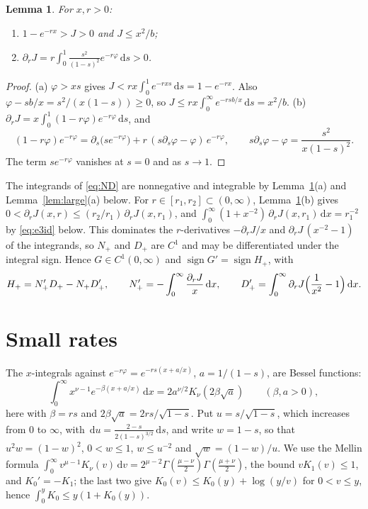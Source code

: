 \documentclass[11pt]{amsart}
\newtheorem{lemma}[theorem]{Lemma}
\theoremstyle{remark}
\numberwithin{equation}{section}
\newcommand{\dd}{\,\mathrm{d}}
\begin{document}
\begin{lemma}\label{lem:J}
For $x,r>0$:
\begin{enumerate}[label=(\alph*)]
\item $1-e^{-rx}>J>0$ and $J\le x^2/b$;
\item $\partial_rJ=r\int_0^1\frac{s^2}{(1-s)^2}e^{-r\varphi}\dd s>0$.
\end{enumerate}
\end{lemma}

\begin{proof}
(a) $\varphi>xs$ gives $J<rx\int_0^1e^{-rxs}\dd s=1-e^{-rx}$. Also $\varphi-sb/x=s^2/(x(1-s))\ge0$, so $J\le rx\int_0^\infty e^{-rsb/x}\dd s=x^2/b$. (b) $\partial_rJ=x\int_0^1(1-r\varphi)e^{-r\varphi}\dd s$, and
\[
(1-r\varphi)e^{-r\varphi}=\partial_s\bigl(se^{-r\varphi}\bigr)+r\,(s\partial_s\varphi-\varphi)\,e^{-r\varphi},\qquad s\partial_s\varphi-\varphi=\frac{s^2}{x(1-s)^2}.
\]
The term $se^{-r\varphi}$ vanishes at $s=0$ and as $s\to1$.
\end{proof}

The integrands of \eqref{eq:ND} are nonnegative and integrable by Lemma~\ref{lem:J}(a) and Lemma~\ref{lem:large}(a) below. For $r\in[r_1,r_2]\subset(0,\infty)$, Lemma~\ref{lem:J}(b) gives $0<\partial_rJ(x,r)\le(r_2/r_1)\,\partial_rJ(x,r_1)$, and $\int_0^\infty(1+x^{-2})\,\partial_rJ(x,r_1)\dd x=r_1^{-2}$ by \eqref{eq:e3id} below. This dominates the $r$-derivatives $-\partial_rJ/x$ and $\partial_rJ\,(x^{-2}-1)$ of the integrands, so $N_+$ and $D_+$ are $C^1$ and may be differentiated under the integral sign. Hence $G\in C^1(0,\infty)$ and $\operatorname{sign}G'=\operatorname{sign}H_+$, with
\begin{equation}\label{eq:H}
H_+=N_+'D_+-N_+D_+',\qquad N_+'=-\int_0^\infty\frac{\partial_rJ}{x}\dd x,\qquad D_+'=\int_0^\infty\partial_rJ\Bigl(\frac1{x^2}-1\Bigr)\dd x.
\end{equation}

\section{Small rates}\label{sec:small}

The $x$-integrals against $e^{-r\varphi}=e^{-rs(x+a/x)}$, $a=1/(1-s)$, are Bessel functions:
\begin{equation}\label{eq:bessel}
\int_0^\infty x^{\nu-1}e^{-\beta(x+a/x)}\dd x=2a^{\nu/2}K_\nu(2\beta\sqrt a)\qquad(\beta,a>0),
\end{equation}
here with $\beta=rs$ and $2\beta\sqrt a=2rs/\sqrt{1-s}$. Put $u=s/\sqrt{1-s}$, which increases from $0$ to $\infty$, with $\dd u=\frac{2-s}{2(1-s)^{3/2}}\dd s$, and write $w=1-s$, so that $u^2w=(1-w)^2$, $0<w\le1$, $w\le u^{-2}$ and $\sqrt w=(1-w)/u$. We use the Mellin formula $\int_0^\infty v^{\mu-1}K_\nu(v)\dd v=2^{\mu-2}\Gamma(\frac{\mu-\nu}2)\Gamma(\frac{\mu+\nu}2)$, the bound $vK_1(v)\le1$, and $K_0'=-K_1$; the last two give $K_0(v)\le K_0(y)+\log(y/v)$ for $0<v\le y$, hence $\int_0^yK_0\le y(1+K_0(y))$.
\end{document}
